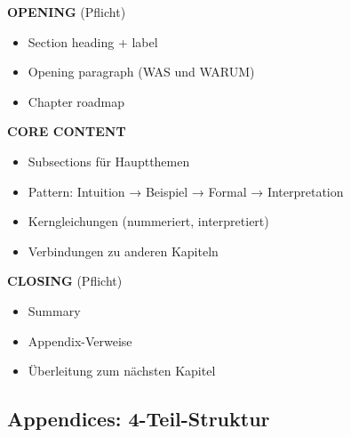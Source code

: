 \documentclass[12pt,a4paper]{article}
\begin{document}
\begin{tcolorbox}[colback=green!5!white, colframe=green!75!black, 
    title=Standard Chapter Template]

\textbf{OPENING} (Pflicht)
\begin{itemize}[nosep]
\item Section heading + label
\item Opening paragraph (WAS und WARUM)
\item Chapter roadmap
\end{itemize}

\textbf{CORE CONTENT}
\begin{itemize}[nosep]
\item Subsections für Hauptthemen
\item Pattern: Intuition → Beispiel → Formal → Interpretation
\item Kerngleichungen (nummeriert, interpretiert)
\item Verbindungen zu anderen Kapiteln
\end{itemize}

\textbf{CLOSING} (Pflicht)
\begin{itemize}[nosep]
\item Summary
\item Appendix-Verweise
\item Überleitung zum nächsten Kapitel
\end{itemize}

\end{tcolorbox}

\subsection{Appendices: 4-Teil-Struktur}
\end{document}
